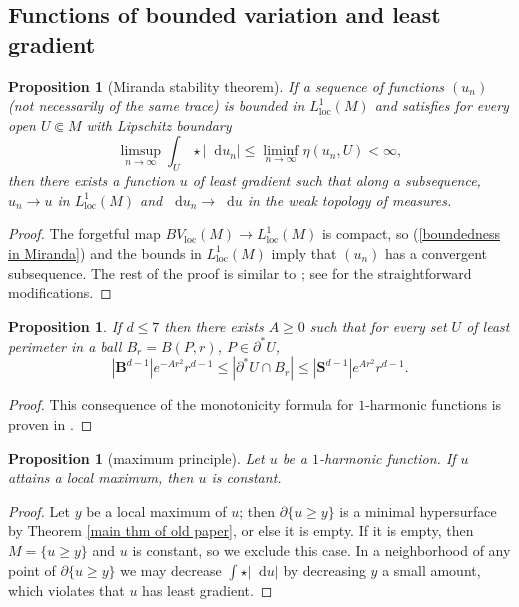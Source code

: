 \documentclass[reqno,11pt]{amsart}
\newcommand{\Sph}{\mathbf S}
\newcommand{\Ball}{\mathbf{B}}
\newcommand*\dif{\mathop{}\!\mathrm{d}}
\newcommand{\loc}{\mathrm{loc}}
\newtheorem{proposition}[theorem]{Proposition}
\theoremstyle{definition}
\numberwithin{equation}{section}
\begin{document}
\subsection{Functions of bounded variation and least gradient}
\begin{proposition}[Miranda stability theorem]
	If a sequence of functions $(u_n)$ (not necessarily of the same trace) is bounded in $L^1_\loc(M)$ and satisfies for every open $U \Subset M$ with Lipschitz boundary
\begin{equation}\label{boundedness in Miranda}
	\limsup_{n \to \infty} \int_U \star |\dif u_n| \leq \liminf_{n \to \infty} \eta(u_n, U) < \infty,
\end{equation}
	then there exists a function $u$ of least gradient such that along a subsequence, $u_n \to u$ in $L^1_\loc(M)$ and $\dif u_n \to \dif u$ in the weak topology of measures.
\end{proposition}
\begin{proof}
The forgetful map $BV_\loc(M) \to L^1_\loc(M)$ is compact, so (\ref{boundedness in Miranda}) and the bounds in $L^1_\loc(M)$ imply that $(u_n)$ has a convergent subsequence.
The rest of the proof is similar to \cite[Teorema 3 and Osservazione 3]{Miranda67}; see \cite[\S2]{BackusFLG} for the straightforward modifications.
\end{proof}

\begin{proposition}\label{doubling dimension}
If $d \leq 7$ then there exists $A \geq 0$ such that for every set $U$ of least perimeter in a ball $B_r = B(P, r)$, $P \in \partial^* U$,
$$|\Ball^{d - 1}| e^{-Ar^2} r^{d - 1} \leq |\partial^* U \cap B_r| \leq |\Sph^{d - 1}| e^{Ar^2} r^{d - 1}.$$
\end{proposition}
\begin{proof}
This consequence of the monotonicity formula for $1$-harmonic functions is proven in \cite[TODO]{BackusFLG}.
\end{proof}

\begin{proposition}[maximum principle]\label{max princip}
Let $u$ be a $1$-harmonic function.
If $u$ attains a local maximum, then $u$ is constant.
\end{proposition}
\begin{proof}
Let $y$ be a local maximum of $u$; then $\partial \{u \geq y\}$ is a minimal hypersurface by Theorem \ref{main thm of old paper}, or else it is empty. If it is empty, then $M = \{u \geq y\}$ and $u$ is constant, so we exclude this case.
In a neighborhood of any point of $\partial \{u \geq y\}$ we may decrease $\int \star |\dif u|$ by decreasing $y$ a small amount, which violates that $u$ has least gradient.
\end{proof}
\end{document}
